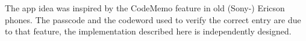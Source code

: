 The app idea was inspired by the CodeMemo feature in old (Sony-) Ericson 
phones.
The passcode and the codeword used to verify the correct entry are due to that 
feature, the implementation described here is independently designed.
